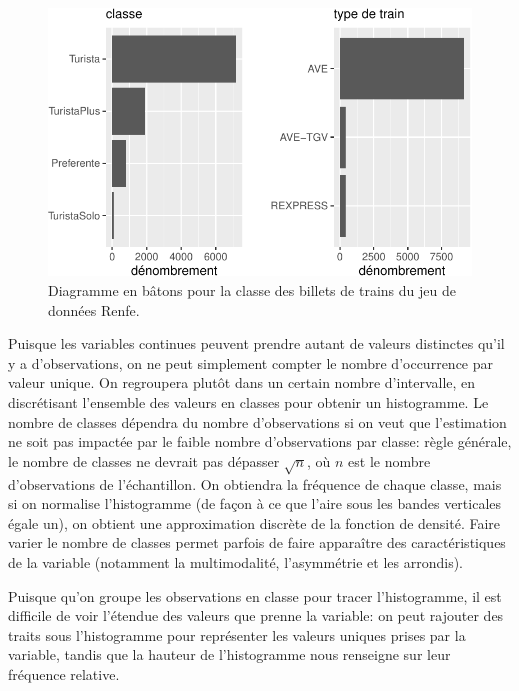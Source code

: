\documentclass[
  11pt,
  letterpaper,
]{scrbook}
\theoremstyle{definition}
\theoremstyle{remark}
\begin{document}
\begin{figure}[ht!]

{\centering \includegraphics[width=1\textwidth,height=\textheight]{./01-analyseexploratoire_files/figure-pdf/fig-barplotrenfe-1.pdf}

}

\caption{\label{fig-barplotrenfe}Diagramme en bâtons pour la classe des
billets de trains du jeu de données Renfe.}

\end{figure}

Puisque les variables continues peuvent prendre autant de valeurs
distinctes qu'il y a d'observations, on ne peut simplement compter le
nombre d'occurrence par valeur unique. On regroupera plutôt dans un
certain nombre d'intervalle, en discrétisant l'ensemble des valeurs en
classes pour obtenir un histogramme. Le nombre de classes dépendra du
nombre d'observations si on veut que l'estimation ne soit pas impactée
par le faible nombre d'observations par classe: règle générale, le
nombre de classes ne devrait pas dépasser \(\sqrt{n}\), où \(n\) est le
nombre d'observations de l'échantillon. On obtiendra la fréquence de
chaque classe, mais si on normalise l'histogramme (de façon à ce que
l'aire sous les bandes verticales égale un), on obtient une
approximation discrète de la fonction de densité. Faire varier le nombre
de classes permet parfois de faire apparaître des caractéristiques de la
variable (notamment la multimodalité, l'asymmétrie et les arrondis).

Puisque qu'on groupe les observations en classe pour tracer
l'histogramme, il est difficile de voir l'étendue des valeurs que prenne
la variable: on peut rajouter des traits sous l'histogramme pour
représenter les valeurs uniques prises par la variable, tandis que la
hauteur de l'histogramme nous renseigne sur leur fréquence relative.
\end{document}
